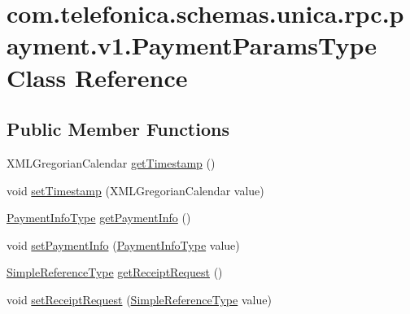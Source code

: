 \hypertarget{classcom_1_1telefonica_1_1schemas_1_1unica_1_1rpc_1_1payment_1_1v1_1_1PaymentParamsType}{
\section{com.telefonica.schemas.unica.rpc.payment.v1.PaymentParamsType Class Reference}
\label{classcom_1_1telefonica_1_1schemas_1_1unica_1_1rpc_1_1payment_1_1v1_1_1PaymentParamsType}
}
\subsection*{Public Member Functions}
\begin{DoxyCompactItemize}
\item 
XMLGregorianCalendar \hyperlink{classcom_1_1telefonica_1_1schemas_1_1unica_1_1rpc_1_1payment_1_1v1_1_1PaymentParamsType_ac4b9663437269b33c95864837ce4425c}{getTimestamp} ()
\item 
void \hyperlink{classcom_1_1telefonica_1_1schemas_1_1unica_1_1rpc_1_1payment_1_1v1_1_1PaymentParamsType_aeed7f66a1cf885efb634f76b1763ec77}{setTimestamp} (XMLGregorianCalendar value)
\item 
\hyperlink{classcom_1_1telefonica_1_1schemas_1_1unica_1_1rpc_1_1payment_1_1v1_1_1PaymentInfoType}{PaymentInfoType} \hyperlink{classcom_1_1telefonica_1_1schemas_1_1unica_1_1rpc_1_1payment_1_1v1_1_1PaymentParamsType_a8501ea0def1769046a90e1f3d1ac8e5f}{getPaymentInfo} ()
\item 
void \hyperlink{classcom_1_1telefonica_1_1schemas_1_1unica_1_1rpc_1_1payment_1_1v1_1_1PaymentParamsType_ae38b5e11eb284fe15c1f92edd06dfff9}{setPaymentInfo} (\hyperlink{classcom_1_1telefonica_1_1schemas_1_1unica_1_1rpc_1_1payment_1_1v1_1_1PaymentInfoType}{PaymentInfoType} value)
\item 
\hyperlink{classcom_1_1telefonica_1_1schemas_1_1unica_1_1rpc_1_1common_1_1v1_1_1SimpleReferenceType}{SimpleReferenceType} \hyperlink{classcom_1_1telefonica_1_1schemas_1_1unica_1_1rpc_1_1payment_1_1v1_1_1PaymentParamsType_a267ee0d6bea0a6ca04783491ef4f6d1b}{getReceiptRequest} ()
\item 
void \hyperlink{classcom_1_1telefonica_1_1schemas_1_1unica_1_1rpc_1_1payment_1_1v1_1_1PaymentParamsType_a391944aac55063ebbf16777c12ae31a7}{setReceiptRequest} (\hyperlink{classcom_1_1telefonica_1_1schemas_1_1unica_1_1rpc_1_1common_1_1v1_1_1SimpleReferenceType}{SimpleReferenceType} value)
\end{DoxyCompactItemize}
